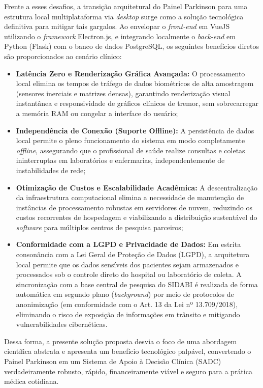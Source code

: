 Frente a esses desafios, a transição arquitetural do Painel Parkinson para uma estrutura local multiplataforma via \textit{desktop} surge como a solução tecnológica definitiva para mitigar tais gargalos. Ao envelopar o \textit{front-end} em VueJS utilizando o \textit{framework} Electron.js, e integrando localmente o \textit{back-end} em Python (Flask) com o banco de dados PostgreSQL, os seguintes benefícios diretos são proporcionados ao cenário clínico:

\begin{itemize}
    \item \textbf{Latência Zero e Renderização Gráfica Avançada:} O processamento local elimina os tempos de tráfego de dados biométricos de alta amostragem (sensores inerciais e matrizes densas), garantindo renderização visual instantânea e responsividade de gráficos clínicos de tremor, sem sobrecarregar a memória RAM ou congelar a interface do usuário;
    \item \textbf{Independência de Conexão (Suporte Offline):} A persistência de dados local permite o pleno funcionamento do sistema em modo completamente \textit{offline}, assegurando que o profissional de saúde realize consultas e coletas ininterruptas em laboratórios e enfermarias, independentemente de instabilidades de rede;
    \item \textbf{Otimização de Custos e Escalabilidade Acadêmica:} A descentralização da infraestrutura computacional elimina a necessidade de manutenção de instâncias de processamento robustas em servidores de nuvem, reduzindo os custos recorrentes de hospedagem e viabilizando a distribuição sustentável do \textit{software} para múltiplos centros de pesquisa parceiros;
    \item \textbf{Conformidade com a LGPD e Privacidade de Dados:} Em estrita consonância com a Lei Geral de Proteção de Dados (LGPD), a arquitetura local permite que os dados sensíveis dos pacientes sejam armazenados e processados sob o controle direto do hospital ou laboratório de coleta. A sincronização com a base central de pesquisa do SIDABI é realizada de forma automática em segundo plano (\textit{background}) por meio de protocolos de anonimização (em conformidade com o Art. 13 da Lei nº 13.709/2018), eliminando o risco de exposição de informações em trânsito e mitigando vulnerabilidades cibernéticas.
\end{itemize}

Dessa forma, a presente solução proposta desvia o foco de uma abordagem científica abstrata e apresenta um benefício tecnológico palpável, convertendo o Painel Parkinson em um Sistema de Apoio à Decisão Clínica (SADC) verdadeiramente robusto, rápido, financeiramente viável e seguro para a prática médica cotidiana.

